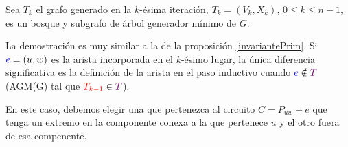 \begin{proposicion}\label{invarianteKruskal}
	Sea \(T_k\) el grafo generado en la \(k\)-ésima iteración,
	\(T_k = (V_{k}, X_{k})\), \(0\leq k \leq n -1\), es un bosque y subgrafo de árbol generador mínimo de \(G\).
\end{proposicion}

\begin{demo}
	La demostración es muy similar a la de la proposición \ref{invariantePrim}. Si \({\color{blue}e}=(u,w)\) es la arista incorporada en el \(k\)-ésimo lugar, la única diferencia significativa es la definición de la arista  en el paso inductivo cuando \({\color{blue}e}\notin{\color{violet}T}\) (AGM(G) tal que \({\color{red}T_{k-1}}\in{\color{violet}T}\)).

	En este caso, debemos elegir una  que pertenezca al circuito \(C = P_{uw} + e\) que tenga un extremo en la componente conexa a la que pertenece \(u\) y el otro fuera de esa compenente.


\end{demo}